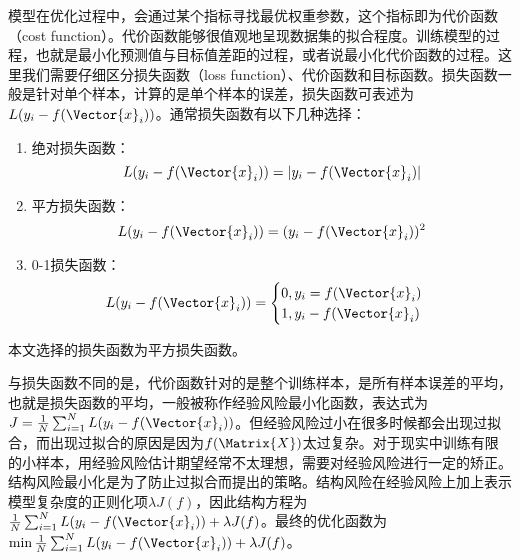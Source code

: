 模型在优化过程中，会通过某个指标寻找最优权重参数，这个指标即为代价函数（cost function）。代价函数能够很值观地呈现数据集的拟合程度。训练模型的过程，也就是最小化预测值与目标值差距的过程，或者说最小化代价函数的过程。这里我们需要仔细区分损失函数（loss function）、代价函数和目标函数。损失函数一般是针对单个样本，计算的是单个样本的误差，损失函数可表述为$L(y_i-f(\Vector{x}_i))$。通常损失函数有以下几种选择：
\begin{enumerate}
    \item 绝对损失函数：\begin{equation}L(y_i-f(\Vector{x}_i))=|y_i-f(\Vector{x}_i)|\end{equation}
    \item 平方损失函数：\begin{equation}L(y_i-f(\Vector{x}_i))=(y_i-f(\Vector{x}_i))^2\end{equation}
    \item 0-1损失函数：
    \begin{equation}
    L(y_i-f(\Vector{x}_i))=
    \begin{cases}
     0, y_i=f(\Vector{x}_i)\\
     1, y_i-f(\Vector{x}_i)
    \end{cases}
    \end{equation}
\end{enumerate}
本文选择的损失函数为平方损失函数。

与损失函数不同的是，代价函数针对的是整个训练样本，是所有样本误差的平均，也就是损失函数的平均，一般被称作经验风险最小化函数，表达式为$J=\frac{1}{N}\sum_{i=1}^{N}L(y_i-f(\Vector{x}_i))$。但经验风险过小在很多时候都会出现过拟合，而出现过拟合的原因是因为$f(\Matrix{X})$太过复杂。对于现实中训练有限的小样本，用经验风险估计期望经常不太理想，需要对经验风险进行一定的矫正。结构风险最小化是为了防止过拟合而提出的策略。结构风险在经验风险上加上表示模型复杂度的正则化项$\lambda J(f)$，因此结构方程为$\frac{1}{N}\sum_{i=1}^{N}L(y_i-f(\Vector{x}_i))+\lambda J(f)$。最终的优化函数为$\min \frac{1}{N}\sum_{i=1}^{N}L(y_i-f(\Vector{x}_i))+\lambda J(f)$。

